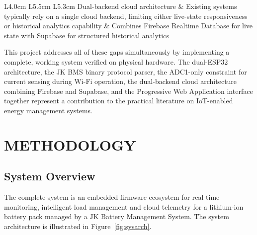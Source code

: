 \documentclass[12pt, a4paper]{report}
\begin{document}
{\begin{longtable}{L{4.0cm} L{5.5cm} L{5.3cm}}
Dual-backend cloud architecture & Existing systems typically rely on a single cloud backend, limiting either live-state responsiveness or historical analytics capability & Combines Firebase Realtime Database for live state with Supabase for structured historical analytics \\

\end{longtable}

This project addresses all of these gaps simultaneously by implementing a
complete, working system verified on physical hardware. The dual-ESP32
architecture, the JK BMS binary protocol parser, the ADC1-only constraint
for current sensing during Wi-Fi operation, the dual-backend cloud
architecture combining Firebase and Supabase, and the Progressive Web
Application interface together represent a contribution to the practical
literature on IoT-enabled energy management systems.



\newpage
\chapter{METHODOLOGY}

\section{System Overview}

The complete system is an embedded firmware ecosystem for real-time
monitoring, intelligent load management and cloud telemetry for a
lithium-ion battery pack managed by a JK Battery Management System. The
system architecture is illustrated in Figure~\ref{fig:sysarch}.

\begin{figure}[H]
\centering
{}
\end{figure}}
\end{document}
